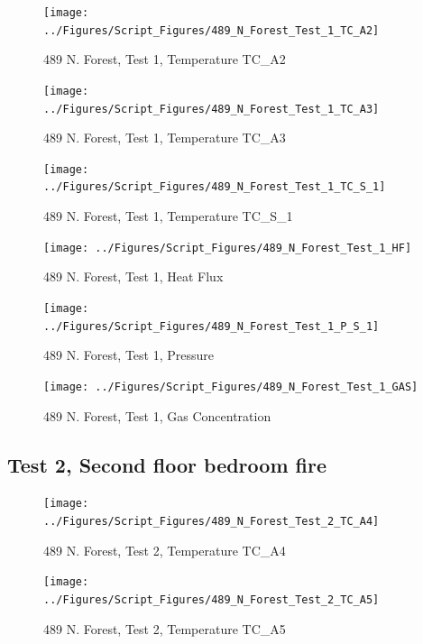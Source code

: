 \documentclass[12pt,oneside]{book}
\begin{document}
\begin{figure}[!ht]
\texttt{[image: ../Figures/Script\_Figures/489\_N\_Forest\_Test\_1\_TC\_A2]}
\caption{489 N. Forest, Test 1, Temperature TC\_A2}
\label{fig:489_N_Forest_Test_1_TC_A2}
\end{figure}

\begin{figure}[!ht]
\texttt{[image: ../Figures/Script\_Figures/489\_N\_Forest\_Test\_1\_TC\_A3]}
\caption{489 N. Forest, Test 1, Temperature TC\_A3}
\label{fig:489_N_Forest_Test_1_TC_A3}
\end{figure}

\begin{figure}[!ht]
\texttt{[image: ../Figures/Script\_Figures/489\_N\_Forest\_Test\_1\_TC\_S\_1]}
\caption{489 N. Forest, Test 1, Temperature TC\_S\_1}
\label{fig:489_N_Forest_Test_1_TC_S_1}
\end{figure}

\begin{figure}[!ht]
\texttt{[image: ../Figures/Script\_Figures/489\_N\_Forest\_Test\_1\_HF]}
\caption{489 N. Forest, Test 1, Heat Flux}
\label{fig:489_N_Forest_Test_1_HF}
\end{figure}

\begin{figure}[!ht]
\texttt{[image: ../Figures/Script\_Figures/489\_N\_Forest\_Test\_1\_P\_S\_1]}
\caption{489 N. Forest, Test 1, Pressure}
\label{fig:489_N_Forest_Test_1_P_S_1}
\end{figure}

\begin{figure}[!ht]
\texttt{[image: ../Figures/Script\_Figures/489\_N\_Forest\_Test\_1\_GAS]}
\caption{489 N. Forest, Test 1, Gas Concentration}
\label{fig:489_N_Forest_Test_1_GAS}
\end{figure}


\clearpage

\subsection{Test 2, Second floor bedroom fire}



\begin{figure}[!ht]
\texttt{[image: ../Figures/Script\_Figures/489\_N\_Forest\_Test\_2\_TC\_A4]}
\caption{489 N. Forest, Test 2, Temperature TC\_A4}
\label{fig:489_N_Forest_Test_2_TC_A4}
\end{figure}

\begin{figure}[!ht]
\texttt{[image: ../Figures/Script\_Figures/489\_N\_Forest\_Test\_2\_TC\_A5]}
\caption{489 N. Forest, Test 2, Temperature TC\_A5}
\label{fig:489_N_Forest_Test_2_TC_A5}
\end{figure}
\end{document}
